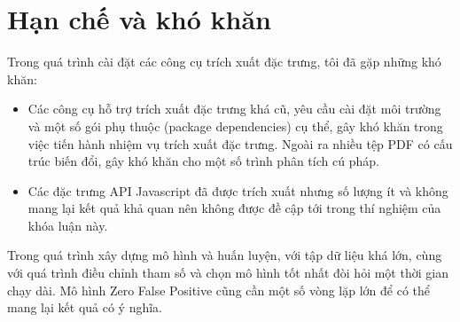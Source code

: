 \documentclass[./../main.tex]{subfiles}
\begin{document}
\section{Hạn chế và khó khăn}

Trong quá trình cài đặt các công cụ trích xuất đặc trưng, tôi đã gặp những khó khăn:
\begin{itemize}
	\item
	      Các công cụ hỗ trợ trích xuất đặc trưng khá cũ, yêu cầu cài đặt môi trường và một số gói phụ thuộc (package dependencies) cụ thể, gây khó khăn trong việc tiến hành nhiệm vụ trích xuất đặc trưng. Ngoài ra nhiều tệp PDF có cấu trúc biến đổi, gây khó khăn cho một số trình phân tích cú pháp.
	\item
	      Các đặc trưng API Javascript đã được trích xuất nhưng số lượng ít và không mang lại kết quả khả quan nên không được đề cập tới trong thí nghiệm của khóa luận này.

\end{itemize}
Trong quá trình xây dựng mô hình và huấn luyện, với tập dữ liệu khá lớn, cùng với quá trình điều chỉnh tham số và chọn mô hình tốt nhất đòi hỏi một thời gian chạy dài. Mô hình Zero False Positive cũng cần một số vòng lặp lớn để có thể mang lại kết quả có ý nghĩa.
\end{document}

